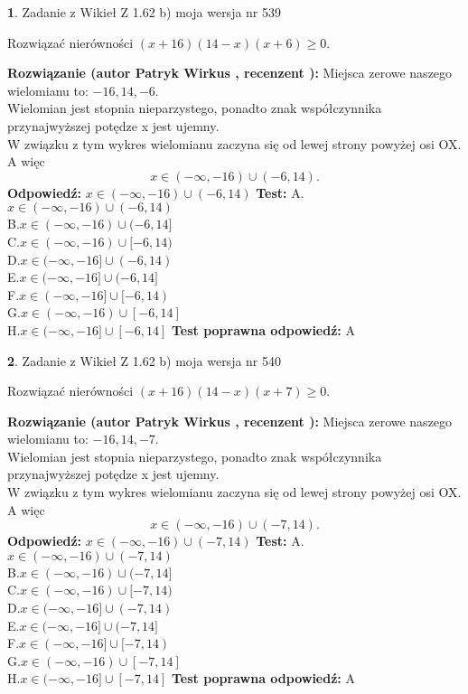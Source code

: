\documentclass[12pt, a4paper]{article}
\theoremstyle{definition} %
\newtheorem{zad}{}
\newcommand{\zadStart}[1]{\begin{zad}#1\newline}
\newcommand{\zadStop}{\end{zad}}
\newcommand{\rozwStart}[2]{\noindent \textbf{Rozwiązanie (autor #1 , recenzent #2): }\newline}
\newcommand{\rozwStop}{\newline}
\newcommand{\odpStart}{\noindent \textbf{Odpowiedź:}\newline}
\newcommand{\odpStop}{\newline}
\newcommand{\testStart}{\noindent \textbf{Test:}\newline}
\newcommand{\testStop}{\newline}
\newcommand{\kluczStart}{\noindent \textbf{Test poprawna odpowiedź:}\newline}
\newcommand{\kluczStop}{\newline}
\begin{document}
\zadStart{Zadanie z Wikieł Z 1.62 b) moja wersja nr 539}

Rozwiązać nierówności $(x+16)(14-x)(x+6)\ge0$.
\zadStop
\rozwStart{Patryk Wirkus}{}
Miejsca zerowe naszego wielomianu to: $-16, 14, -6$.\\
Wielomian jest stopnia nieparzystego, ponadto znak współczynnika przy\linebreak najwyższej potędze x jest ujemny.\\ W związku z tym wykres wielomianu zaczyna się od lewej strony powyżej osi OX. A więc $$x \in (-\infty,-16) \cup (-6,14).$$
\rozwStop
\odpStart
$x \in (-\infty,-16) \cup (-6,14)$
\odpStop
\testStart
A.$x \in (-\infty,-16) \cup (-6,14)$\\
B.$x \in (-\infty,-16) \cup (-6,14]$\\
C.$x \in (-\infty,-16) \cup [-6,14)$\\
D.$x \in (-\infty,-16] \cup (-6,14)$\\
E.$x \in (-\infty,-16] \cup (-6,14]$\\
F.$x \in (-\infty,-16] \cup [-6,14)$\\
G.$x \in (-\infty,-16) \cup [-6,14]$\\
H.$x \in (-\infty,-16] \cup [-6,14]$
\testStop
\kluczStart
A
\kluczStop



\zadStart{Zadanie z Wikieł Z 1.62 b) moja wersja nr 540}

Rozwiązać nierówności $(x+16)(14-x)(x+7)\ge0$.
\zadStop
\rozwStart{Patryk Wirkus}{}
Miejsca zerowe naszego wielomianu to: $-16, 14, -7$.\\
Wielomian jest stopnia nieparzystego, ponadto znak współczynnika przy\linebreak najwyższej potędze x jest ujemny.\\ W związku z tym wykres wielomianu zaczyna się od lewej strony powyżej osi OX. A więc $$x \in (-\infty,-16) \cup (-7,14).$$
\rozwStop
\odpStart
$x \in (-\infty,-16) \cup (-7,14)$
\odpStop
\testStart
A.$x \in (-\infty,-16) \cup (-7,14)$\\
B.$x \in (-\infty,-16) \cup (-7,14]$\\
C.$x \in (-\infty,-16) \cup [-7,14)$\\
D.$x \in (-\infty,-16] \cup (-7,14)$\\
E.$x \in (-\infty,-16] \cup (-7,14]$\\
F.$x \in (-\infty,-16] \cup [-7,14)$\\
G.$x \in (-\infty,-16) \cup [-7,14]$\\
H.$x \in (-\infty,-16] \cup [-7,14]$
\testStop
\kluczStart
A
\kluczStop
\end{document}
